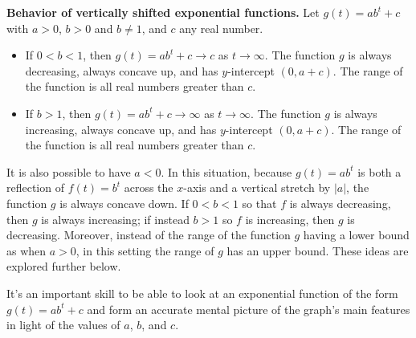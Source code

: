 \documentclass[nooutcomes]{ximera}
\begin{document}
\begin{callout}
\textbf{\Large Behavior of vertically shifted exponential functions.}
Let \(g(t) = ab^t + c\) with \(a \gt 0\), \(b \gt 0\) and \(b \ne 1\), and \(c\) any real number.
\begin{itemize}
\item If \(0 \lt b \lt 1\), then \(g(t) = ab^t + c \to c\) as \(t \to \infty\).  The function \(g\) is always decreasing, always concave up, and has \(y\)-intercept \((0,a+c)\).  The range of the function is all real numbers greater than \(c\).
\item If \(b \gt 1\), then \(g(t) = ab^t + c \to \infty\) as \(t \to \infty\).  The function \(g\) is always increasing, always concave up, and has \(y\)-intercept \((0,a+c)\).  The range of the function is all real numbers greater than \(c\).
\end{itemize}
\end{callout}


It is also possible to have \(a \lt 0\).  In this situation, because \(g(t) = ab^t\) is both a reflection of \(f(t) = b^t\) across the \(x\)-axis and a vertical stretch by \(|a|\), the function \(g\) is always concave down.  If \(0 \lt b \lt 1\) so that \(f\) is always decreasing, then \(g\) is always increasing; if instead \(b \gt 1\) so \(f\) is increasing, then \(g\) is decreasing.  Moreover, instead of the range of the function \(g\) having a lower bound as when \(a \gt 0\), in this setting the range of \(g\) has an upper bound.  These ideas are explored further below.

It's an important skill to be able to look at an exponential function of the form \(g(t) = ab^t + c\) and form an accurate mental picture of the graph's main features in light of the values of \(a\), \(b\), and \(c\).
\end{document}
